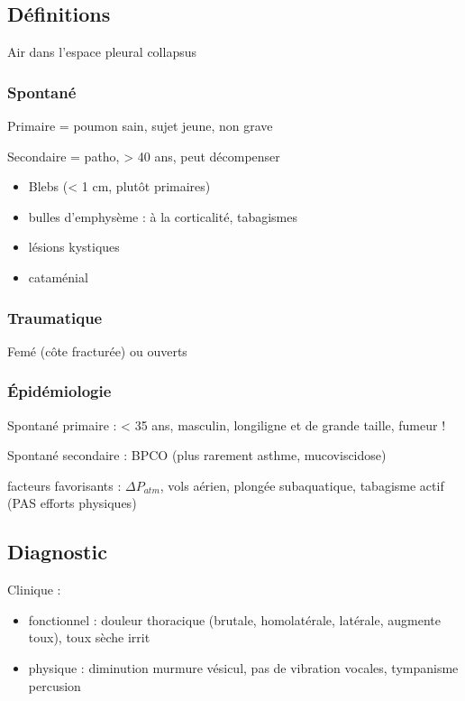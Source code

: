 \documentclass{book}
\begin{document}
\subsection{Définitions}
\label{sec:org1ef7b3c}
Air dans l'espace pleural \thus collapsus 

\subsubsection{Spontané}
\label{sec:org2b4a042}
Primaire = poumon sain, sujet jeune, non grave

Secondaire = patho, > 40 ans, peut décompenser


\begin{itemize}
\item Blebs (< 1 cm, plutôt primaires)
\item bulles d'emphysème : à la corticalité, tabagismes
\item lésions kystiques
\item cataménial
\end{itemize}


\subsubsection{Traumatique}
\label{sec:org595874c}
Femé (côte fracturée) ou ouverts

\subsubsection{Épidémiologie}
\label{sec:org4154606}
Spontané primaire : < 35 ans, masculin, longiligne et de grande taille, fumeur !

Spontané secondaire : BPCO (plus rarement asthme, mucoviscidose)

facteurs favorisants : \(\Delta P_{atm}\), vols aérien, plongée subaquatique,
tabagisme actif (PAS
efforts physiques)

\subsection{Diagnostic}
\label{sec:orgd5306dc}
Clinique : 

\begin{itemize}
\item fonctionnel : douleur thoracique (brutale, homolatérale, latérale,
augmente toux), toux sèche irrit
\item physique : diminution murmure vésicul, pas de vibration vocales,
tympanisme percusion
\end{itemize}
\end{document}
